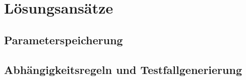 \chapter{Lösungsansätze}\label{chp:loesungsansaetze}




\section{Parameterspeicherung}
\paragraph{}

\newpage
\section{Abhängigkeitsregeln und Testfallgenerierung}
\paragraph{}


